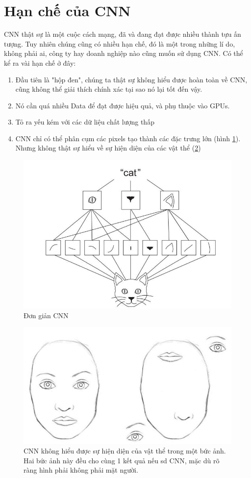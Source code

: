 \documentclass{article}
\begin{document}
\section{Hạn chế của CNN}
CNN thật sự là một cuộc cách mạng, đã và đang đạt được nhiều thành tựu ấn tượng. Tuy nhiên chúng cũng có nhiều hạn chế, đó là một trong những lí do, không phải ai, công ty hay doanh nghiệp nào cũng muốn sử dụng CNN. Có thể kể ra vài hạn chế ở đây:\begin{enumerate}
    \item Đầu tiên là "hộp đen", chúng ta thật sự không hiểu được hoàn toàn về CNN, cũng không thể giải thích chính xác tại sao nó lại tốt đến vậy.
    \item Nó cần quá nhiều Data để đạt được hiệu quả, và phụ thuộc vào GPUs.
    \item Tỏ ra yếu kém với các dữ liệu chất lượng thấp
    \item CNN chỉ có thể phân cụm các pixels tạo thành các đặc trưng lớn (hình \ref{fig22}). Nhưng không thật sự hiểu về sự hiện diện của các vật thể (\ref{fig23})
\end{enumerate}
\begin{figure}
    \centering
    \includegraphics[width = 0.8\linewidth]{download (1).jpg}
    \caption{Đơn giản CNN}
    \label{fig22}
\end{figure}
\begin{figure}
    \centering
    \includegraphics[width = 0.6\linewidth]{download (2).jpg}
    \caption{CNN không hiểu được sự hiện diện của vật thể trong một bức ảnh. Hai bức ảnh này đều cho cùng 1 kết quả nếu sd CNN, mặc dù rõ ràng hình phải không phải mặt người.}
    \label{fig23}
\end{figure}
\end{document}
